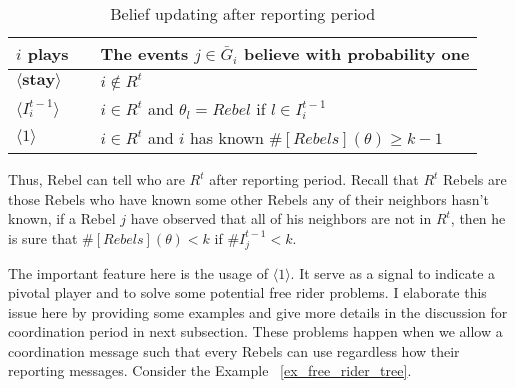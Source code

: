 \documentclass[12pt,letter]{article}
\theoremstyle{definition}
\theoremstyle{remark}
\theoremstyle{claim}
\begin{document}
\begin{table}[ht]
\caption{Belief updating after reporting period}
\label{Table_blf_up_reporting}
\begin{center}
\begin{tabular}{l c l}
$i$ plays 		&  			& The events $j\in \bar{G}_i$ believe with probability one  \\
\hline
$\langle  \textbf{stay} \rangle$ 	& 			    & $i\notin R^t$  \\
$\langle  {I^{t-1}_i} \rangle$ 		&  			& $i\in R^t$ and $\theta_l=Rebel$ if $l\in I^{t-1}_i$      \\
$\langle 1 \rangle$ 		             &  			& $i\in R^t$ and $i$ has known $\#[Rebels](\theta)\geq k-1$ \\
\end{tabular}
\end{center}
\end{table}

Thus, Rebel can tell who are $R^t$ after reporting period. Recall that $R^t$ Rebels are those Rebels who have known some other Rebels any of their neighbors hasn't known, if a Rebel $j$ have observed that all of his neighbors are not in $R^t$, then he is sure that $\#[Rebels](\theta)< k$ if $\#I^{t-1}_j<k$. 

The important feature here is the usage of $\langle 1 \rangle$. It serve as a signal to indicate a pivotal player and to solve some potential free rider problems. I elaborate this issue here by providing some examples and give more details in the discussion for coordination period in next subsection. These problems happen when we allow a coordination message such that every Rebels can use regardless how their reporting messages. Consider the Example ~\ref{ex_free_rider_tree}.
\end{document}
